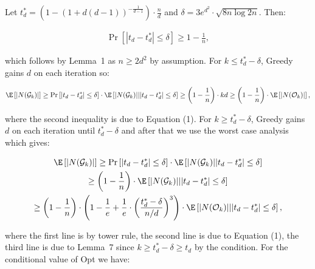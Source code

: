 \documentclass[10pt,a4paper]{article}
\begin{document}
Let $t^{*}_{d}=\left(1-\left(1+d(d-1)\right)^{-\frac{1}{d-1}}\right)\cdot\frac{n}{d}$ and $\delta=3e^{d^{2}}\cdot\sqrt{8n\log{2n}}$.
Then:\par


\[\begin{gathered}
\displaystyle\Pr\left[|t_{d}-t^{*}_{d}|\leq\delta\right]\geq 1-\frac{1}{n},
\end{gathered}\]


which follows by Lemma 1 as $n\geq 2d^{2}$ by assumption.
For $k\leq t^{*}_{d}-\delta$, Greedy gains $d$ on each iteration so:\par


\[\begin{gathered}
\displaystyle\E\left[|N(\mathcal{G}_{k})|\right]\geq\Pr\left[|t_{d}-t^{*}_{d}|\leq\delta\right]\cdot\E\left[|N(\mathcal{G}_{k})|\middle||t_{d}-t^{*}_{d}|\leq\delta\right]\geq\left(1-\frac{1}{n}\right)\cdot kd\geq\left(1-\frac{1}{n}\right)\cdot\E\left[|N(\mathcal{O}_{k})|\right],
\end{gathered}\]


where the second inequality is due to Equation (1).
For $k\geq t^{*}_{d}-\delta$, Greedy gains $d$ on each iteration until $t^{*}_{d}-\delta$ and after that we use the worst case analysis which gives:\par


\[\begin{gathered}
\displaystyle\E\left[|N(\mathcal{G}_{k})|\right] \displaystyle\geq\Pr\left[|t_{d}-t^{*}_{d}|\leq\delta\right]\cdot\E\left[|N(\mathcal{G}_{k})\middle||t_{d}-t^{*}_{d}|\leq\delta\right] \\
\displaystyle\geq\left(1-\frac{1}{n}\right)\cdot\E\left[|N(\mathcal{G}_{k})|\middle||t_{d}-t^{*}_{d}|\leq\delta\right] \\
\displaystyle\geq\left(1-\frac{1}{n}\right)\cdot\left(1-\frac{1}{e}+\frac{1}{e}\cdot\left(\frac{t^{*}_{d}-\delta}{n/d}\right)^{3}\right)\cdot\E\left[|N(\mathcal{O}_{k})|\middle||t_{d}-t^{*}_{d}|\leq\delta\right],
\end{gathered}\]


where the first line is by tower rule, the second line is due to Equation (1), the third line is due to Lemma 7 since $k\geq t^{*}_{d}-\delta\geq t_{d}$ by the condition.
For the conditional value of Opt we have:\par
\end{document}
